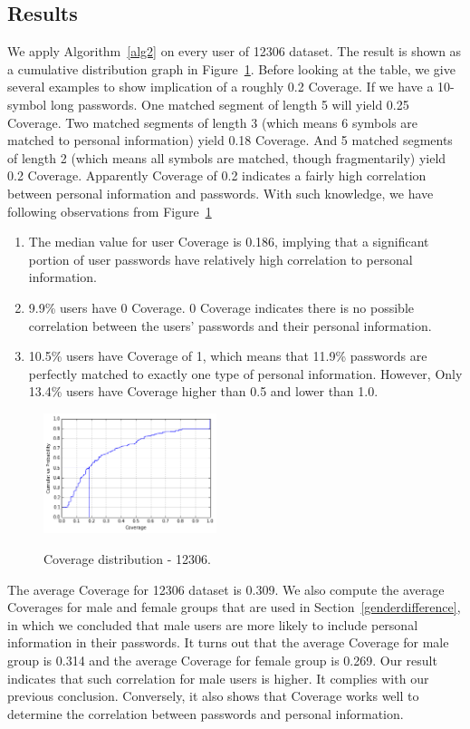 \subsection{Results}
We apply Algorithm~\ref{alg2} on every user of 12306 dataset. The result is shown as a cumulative distribution graph in Figure~\ref{f2}. Before looking at the table, we give several examples to show implication of a roughly 0.2 Coverage. If we have a 10-symbol long passwords. One matched segment of length 5 will yield 0.25 Coverage. Two matched segments of length 3 (which means 6 symbols are matched to personal information) yield 0.18 Coverage. And 5 matched segments of length 2 (which means all symbols are matched, though fragmentarily) yield 0.2 Coverage. Apparently Coverage of 0.2 indicates a fairly high correlation between personal information and passwords. With such knowledge, we have following observations from Figure~\ref{f2}
\begin{enumerate}[leftmargin=*]
\item The median value for user Coverage is 0.186, implying that a significant portion of user passwords have relatively high correlation to personal information.
\item 9.9\% users have 0 Coverage. 0 Coverage indicates there is no possible correlation between the users' passwords and their personal information.
\item 10.5\% users have Coverage of 1, which means that 11.9\% passwords are perfectly matched to exactly one type of personal information. However, Only 13.4\% users have Coverage higher than 0.5 and lower than 1.0. 
\end{enumerate}

\begin{figure}[h!]
\centering
  \caption{Coverage distribution - 12306.}{}
  \label{f2}
  \centering
    \includegraphics[width=0.45\textwidth]{fig/cvghist}
\end{figure}

The average Coverage for 12306 dataset is 0.309. We also compute the average Coverages for male and female groups that are used in Section~\ref{genderdifference}, in which we concluded that male users are more likely to include personal information in their passwords. It turns out that the average Coverage for male group is 0.314 and the average Coverage for female group is 0.269. Our result indicates that such correlation for male users is higher. It complies with our previous conclusion. Conversely, it also shows that Coverage works well to determine the correlation between passwords and personal information.

